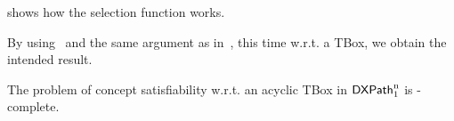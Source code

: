  shows how the selection function works.



By using~ and the same argument as in~, this time w.r.t. a TBox, we obtain the intended result.

\begin{theorem}\label{th:concept-wrt-tbox-xp}
The problem of concept satisfiability w.r.t. an acyclic TBox in $\mathsf{DXPath}_{\rm 1}^{\rm n}$ is \np-complete.
\end{theorem}